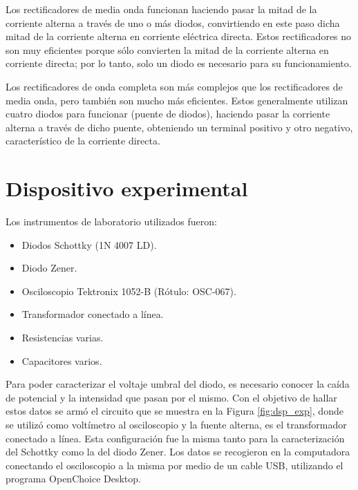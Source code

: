 \documentclass[twoside,twocolumn,a4paper]{article}
\begin{document}
Los rectificadores de media onda funcionan haciendo pasar la mitad de la corriente alterna a trav\'es de uno o m\'as diodos, convirtiendo en este paso dicha mitad de la corriente alterna en corriente el\'ectrica directa. Estos rectificadores no son muy eficientes porque s\'olo convierten la mitad de la corriente alterna en corriente directa; por lo tanto, solo un diodo es necesario para su funcionamiento.\par

Los rectificadores de onda completa son m\'as complejos que los rectificadores de media onda, pero tambi\'en son mucho m\'as eficientes. Estos generalmente utilizan cuatro diodos para funcionar (puente de diodos), haciendo pasar la corriente alterna a trav\'es de dicho puente, obteniendo un terminal positivo y otro negativo, caracter\'istico de la corriente directa.



\section{Dispositivo experimental}
Los instrumentos de laboratorio utilizados fueron:
\begin{itemize}
\item 
\label{diodo} Diodos Schottky (1N 4007 LD). %
\item 
\label{zener} Diodo Zener.
\item 
\label{osc} Osciloscopio Tektronix 1052-B (R\'otulo: OSC-067)\cite{osc}. %
\item
\label{trans} Transformador conectado a l\'inea. 
\item Resistencias varias.
\item Capacitores varios.
\end{itemize}

Para poder caracterizar el voltaje umbral del diodo, es necesario conocer la ca\'ida de potencial y la intensidad que pasan por el mismo. Con el objetivo de hallar estos datos se arm\'o el circuito que se muestra en la Figura \ref{fig:dsp_exp}, donde se utiliz\'o como volt\'imetro al osciloscopio y la fuente alterna, es el transformador conectado a l\'inea. Esta configuraci\'on fue la misma tanto para la caracterizaci\'on del Schottky como la del diodo Zener. Los datos se recogieron en la computadora conectando el osciloscopio a la misma por medio de un cable USB, utilizando el programa OpenChoice Desktop. \par 
\end{document}
